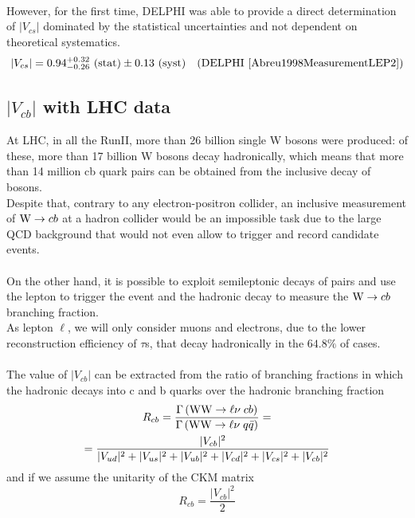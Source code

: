 \\
However, for the first time, DELPHI was able to provide a direct determination of $|V_{cs}|$ dominated by the statistical uncertainties and not dependent on theoretical systematics.
\begin{equation}
\begin{aligned}
    |V_{cs}|&=0.94^{+0.32}_{-0.26}  \text{ (stat)} \pm 0.13 \text{ (syst)} & \text{(DELPHI \cite{Abreu1998MeasurementLEP2})}
\end{aligned}
\end{equation}


\subsection{$|V_{cb}|$ with LHC data}
At LHC, in all the RunII, more than 26 billion single W bosons were produced: of these, more than 17 billion W bosons decay hadronically, which means that more than 14 million cb quark pairs can be obtained from the inclusive decay of \PW bosons.\\
Despite that, contrary to any electron-positron collider, an inclusive measurement of ${\text{W}} \to cb$ at a hadron collider would be an impossible task due to the large QCD background that would not even allow to trigger and record candidate events.\\
\\
On the other hand, it is possible to exploit semileptonic decays of \PW pairs and use the lepton to trigger the event and the hadronic \PW decay to measure the ${\text{W}} \to cb$ branching fraction.\\
As lepton $\ell$, we will only consider muons and electrons, due to the lower reconstruction efficiency of $\tau$s, that decay hadronically in the $64.8\%$ of cases.
\\
\\
The value of $|V_{cb}|$ can be extracted from the ratio of branching fractions in which the hadronic \PW decays into c and b quarks over the  \PW hadronic branching fraction
\begin{equation}
\begin{gathered}
    R_{cb}=\frac{\Gamma\left({\text{W}}{\text{W}} \to \ell \nu\; cb\right)}{\Gamma\left({\text{W}}{\text{W}} \to \ell \nu\; q\bar{q}\right)}=\\ =\frac{|V_{cb}|^2}{|V_{ud}|^2+|V_{us}|^2+|V_{ub}|^2+|V_{cd}|^2+|V_{cs}|^2+|V_{cb}|^2}
\end{gathered}
\end{equation}
and if we assume the unitarity of the CKM matrix
\begin{equation}
    R_{cb}=\frac{|V_{cb}|^2}{2}
\end{equation}


